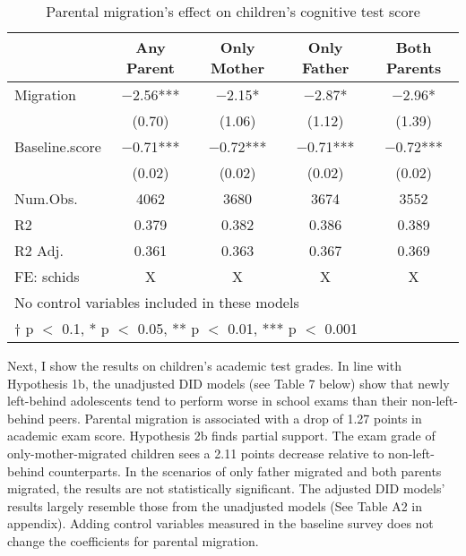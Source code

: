 \documentclass[
  man,floatsintext]{apa7}
\begin{document}
\begin{table}

\caption{Parental migration’s effect on children’s cognitive test score}
\centering
\begin{tabular}[t]{lcccc}
\toprule
  & Any Parent & Only Mother & Only Father & Both Parents\\
\midrule
Migration & \num{-2.56}*** & \num{-2.15}* & \num{-2.87}* & \num{-2.96}*\\
 & (\num{0.70}) & (\num{1.06}) & (\num{1.12}) & (\num{1.39})\\
Baseline.score & \num{-0.71}*** & \num{-0.72}*** & \num{-0.71}*** & \num{-0.72}***\\
 & (\num{0.02}) & (\num{0.02}) & (\num{0.02}) & (\num{0.02})\\
\midrule
Num.Obs. & \num{4062} & \num{3680} & \num{3674} & \num{3552}\\
R2 & \num{0.379} & \num{0.382} & \num{0.386} & \num{0.389}\\
R2 Adj. & \num{0.361} & \num{0.363} & \num{0.367} & \num{0.369}\\
FE: schids & X & X & X & X\\
\bottomrule
\multicolumn{5}{l}{\rule{0pt}{1em}No control variables included in these models}\\
\multicolumn{5}{l}{\rule{0pt}{1em}† p $<$ 0.1, * p $<$ 0.05, ** p $<$ 0.01, *** p $<$ 0.001}\\
\end{tabular}
\end{table}

Next, I show the results on children's academic test grades. In line with Hypothesis 1b, the unadjusted DID models (see Table 7 below) show that newly left-behind adolescents tend to perform worse in school exams than their non-left-behind peers. Parental migration is associated with a drop of 1.27 points in academic exam score. Hypothesis 2b finds partial support. The exam grade of only-mother-migrated children sees a 2.11 points decrease relative to non-left-behind counterparts. In the scenarios of only father migrated and both parents migrated, the results are not statistically significant. The adjusted DID models' results largely resemble those from the unadjusted models (See Table A2 in appendix). Adding control variables measured in the baseline survey does not change the coefficients for parental migration.
\end{document}
